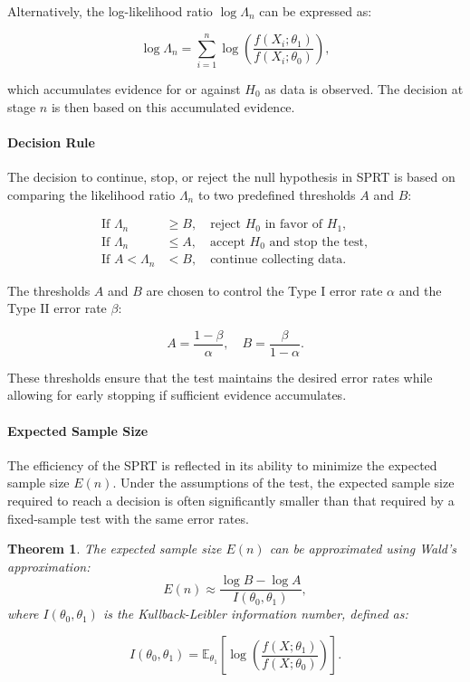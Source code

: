 \documentclass[magisterska, english]{pwr_wmat_praca_dyplomowa}
\theoremstyle{plain}
\newtheorem{theorem}{Theorem}
\numberwithin{theorem}{chapter}
\theoremstyle{definition}
\numberwithin{theorem}{chapter}
\begin{document}
Alternatively, the log-likelihood ratio \( \log \Lambda_n \) can be expressed as:

\[
\log \Lambda_n = \sum_{i=1}^{n} \log \left(\frac{f(X_i; \theta_1)}{f(X_i; \theta_0)}\right),
\]

which accumulates evidence for or against \( H_0 \) as data is observed. The decision at stage \( n \) is then based on this accumulated evidence.

\paragraph{Decision Rule}

The decision to continue, stop, or reject the null hypothesis in SPRT is based on comparing the likelihood ratio \( \Lambda_n \) to two predefined thresholds \( A \) and \( B \):

\begin{align*}
	\text{If } \Lambda_n &\geq B, \quad \text{reject } H_0 \text{ in favor of } H_1, \\
	\text{If } \Lambda_n &\leq A, \quad \text{accept } H_0 \text{ and stop the test}, \\
	\text{If } A < \Lambda_n &< B, \quad \text{continue collecting data}.
\end{align*}

The thresholds \( A \) and \( B \) are chosen to control the Type I error rate \( \alpha \) and the Type II error rate \( \beta \):

\[
A = \frac{1 - \beta}{\alpha}, \quad B = \frac{\beta}{1 - \alpha}.
\]

These thresholds ensure that the test maintains the desired error rates while allowing for early stopping if sufficient evidence accumulates.

\paragraph{Expected Sample Size}
The efficiency of the SPRT is reflected in its ability to minimize the expected sample size \( E(n) \). Under the assumptions of the test, the expected sample size required to reach a decision is often significantly smaller than that required by a fixed-sample test with the same error rates. 

\begin{theorem}
The expected sample size \( E(n) \) can be approximated using Wald's approximation:
\[
E(n) \approx \frac{\log B - \log A}{I(\theta_0, \theta_1)},
\]
where \( I(\theta_0, \theta_1) \) is the Kullback-Leibler information number, defined as:

\[
I(\theta_0, \theta_1) = \mathbb{E}_{\theta_1}\left[\log \left(\frac{f(X; \theta_1)}{f(X; \theta_0)}\right)\right].
\]
\end{theorem}
\end{document}
